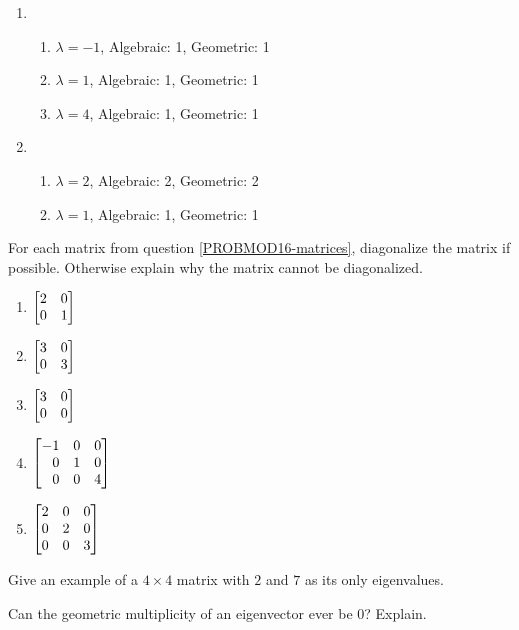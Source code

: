 \begin{exercises}
\begin{problist}
\begin{solution}
\begin{enumerate}
				\item
					\begin{enumerate}
						\item $\lambda=-1$, Algebraic: 1,
							Geometric: 1

						\item $\lambda=1$, Algebraic: 1,
							Geometric: 1

						\item $\lambda=4$, Algebraic: 1,
							Geometric: 1
					\end{enumerate}%


				\item
					\begin{enumerate}
						\item $\lambda=2$, Algebraic: 2,
							Geometric: 2

						\item $\lambda=1$, Algebraic: 1,
							Geometric: 1
					\end{enumerate}
			\end{enumerate}
		\end{solution}\prob For each matrix from question \ref{PROBMOD16-matrices},
		diagonalize the matrix if possible. Otherwise explain why the matrix cannot
		be diagonalized. %

		\begin{solution}

			\begin{enumerate}
				\item $\mat{2&0\\0&1}$

				\item $\mat{3&0\\0&3}$

				\item $\mat{3&0\\0&0}$

				\item $\mat{-1&0&0\\0&1&0\\0&0&4}$

				\item $\mat{2&0&0\\0&2&0\\0&0&3}$
			\end{enumerate}
		\end{solution}\prob Give an example of a $4\times 4$ matrix with $2$ and $7$
		as its only eigenvalues.

		\prob Can the geometric multiplicity of an eigenvector ever be $0$?
		Explain. %


\end{problist}
\end{exercises}
